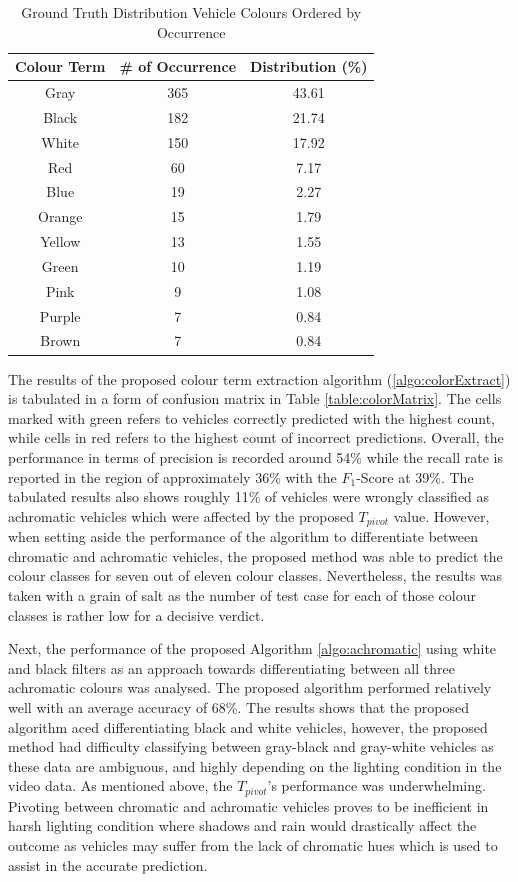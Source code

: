 \begin{table}[bht!]
\centering
\caption{Ground Truth Distribution Vehicle Colours Ordered by Occurrence}
\label{table:colorDist}
\begin{tabular}{ccc}
\toprule
Colour Term & \# of Occurrence & Distribution (\%)   \\
\midrule
Gray       & 365       & 43.61  \\
Black      & 182       & 21.74  \\
White      & 150       & 17.92  \\
Red        & 60        & 7.17   \\
Blue       & 19        & 2.27   \\
Orange     & 15        & 1.79   \\
Yellow     & 13        & 1.55   \\
Green      & 10        & 1.19   \\
Pink       & 9         & 1.08   \\
Purple     & 7         & 0.84   \\
Brown      & 7         & 0.84   \\
\bottomrule
\end{tabular}
\end{table}


The results of the proposed colour term extraction algorithm
(\ref{algo:colorExtract}) is tabulated in a form of confusion matrix in Table
\ref{table:colorMatrix}. The cells marked with green refers to vehicles
correctly predicted with the highest count, while cells in red refers to the
highest count of incorrect predictions. Overall, the performance in terms of
precision is recorded around 54\% while the recall rate is reported in the
region of approximately 36\% with the $F_1$-Score at 39\%.
The tabulated results also shows roughly 11\% of vehicles were wrongly
classified as achromatic vehicles which were affected by the proposed
$T_{pivot}$ value. However, when setting aside the performance of the algorithm
to differentiate between chromatic and achromatic vehicles, the proposed method
was able to predict the colour classes for seven out of eleven colour classes.
Nevertheless, the results was taken with a grain of salt as the number of test
case for each of those colour classes is rather low for a decisive verdict.

Next, the performance of the proposed Algorithm \ref{algo:achromatic} using
white and black filters as an approach towards differentiating between all
three achromatic colours was analysed. The proposed algorithm performed
relatively well with an average accuracy of 68\%. The results shows that the
proposed algorithm aced differentiating black and white vehicles, however, the
proposed method had difficulty classifying between gray-black and gray-white
vehicles as these data are ambiguous, and highly depending on the lighting
condition in the video data.
As mentioned above, the $T_{pivot}$'s performance was underwhelming. Pivoting
between chromatic and achromatic vehicles proves to be inefficient in harsh
lighting condition where shadows and rain would drastically affect the outcome
as vehicles may suffer from the lack of chromatic hues which is used to assist
in the accurate prediction.

